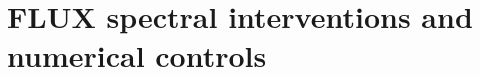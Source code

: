\section{FLUX spectral interventions and numerical controls}\label{app:interventions}\label{app:spectrum}\label{app:diffspec}

